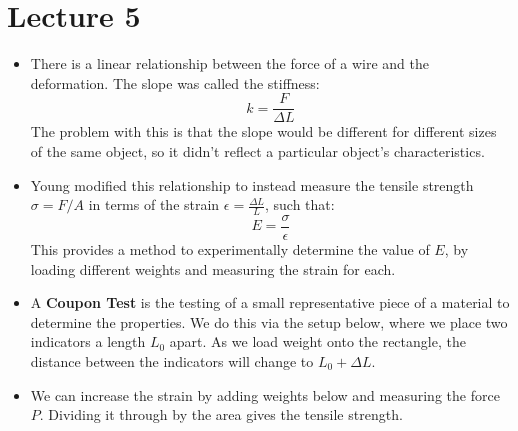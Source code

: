 \section{Lecture 5}
\begin{itemize}
    \item There is a linear relationship between the force of a wire and the deformation. The slope was called the stiffness:
    \begin{equation}
        k = \frac{F}{\Delta L}
        \label{eq:}
    \end{equation}
    The problem with this is that the slope would be different for different sizes of the same object, so it didn't reflect a particular object's characteristics.
    \item Young modified this relationship to instead measure the tensile strength $\sigma=F/A$ in terms of the strain $\epsilon=\frac{\Delta L}{L}$, such that:
    \begin{equation}
        E = \frac{\sigma}{\epsilon}
        \label{eq:}
    \end{equation}
    This provides a method to experimentally determine the value of $E$, by loading different weights and measuring the strain for each.
    \item A \textbf{Coupon Test} is the testing of a small representative piece of a material to determine the properties. We do this via the setup below, where we place two indicators a length $L_0$ apart. As we load weight onto the rectangle, the distance between the indicators will change to $L_0+\Delta L$.
    \begin{center}
    \end{center}
    \item We can increase the strain by adding weights below and measuring the force $P$. Dividing it through by the area gives the tensile strength.
    \begin{center}
\end{center}
\end{itemize}
